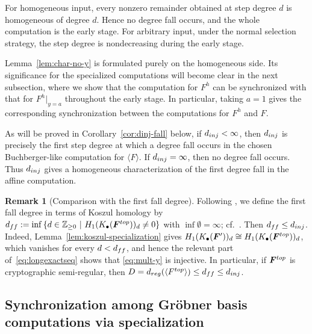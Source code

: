 \documentclass{article}
\theoremstyle{definition}
\newtheorem{remark}[theorem]{Remark}
\theoremstyle{plain}
\theoremstyle{plain}
\theoremstyle{plain}
\theoremstyle{plain}
\numberwithin{equation}{subsection}
\begin{document}
For homogeneous input, every nonzero remainder obtained at step degree $d$ is homogeneous of degree $d$.
Hence no degree fall occurs, and the whole computation is the early stage.
For arbitrary input, under the normal selection strategy, the step degree is nondecreasing during the early stage.

Lemma~\ref{lem:char-no-y} is formulated purely on the homogeneous side.
Its significance for the specialized computations will become clear in the next subsection, where we show that the computation for $F^h$ can be synchronized with that for $F^h|_{y=a}$ throughout the early stage.
In particular, taking $a=1$ gives the corresponding synchronization between the computations for $F^h$ and $F$.

As will be proved in Corollary~\ref{cor:dinj-fall} below, if $d_{\rm inj}<\infty$, then $d_{\rm inj}$ is precisely the first step degree at which a degree fall occurs in the chosen Buchberger-like computation for $\langle F\rangle$.
If $d_{\rm inj}=\infty$, then no degree fall occurs.
Thus $d_{\rm inj}$ gives a homogeneous characterization of the first degree fall in the affine computation.

\begin{remark}[Comparison with the first fall degree]\label{rem:first-fall}
Following \cite[Remark~1]{KY}, we define the first fall degree in terms of Koszul homology by $d_{\rm ff}
:=
\inf\left\{
d\in\mathbb Z_{\geq0}
\ \middle|\
H_1(K_\bullet(\bm F^{\rm top}))_d\neq0
\right\}$ with $\inf\emptyset=\infty$; cf.~\cite[Definition~1.3]{CG23}.
Then $d_{\rm ff}\leq d_{\rm inj}$.
Indeed, Lemma~\ref{lem:koszul-specialization} gives $H_1(K_\bullet(\bm F'))_d \cong H_1(K_\bullet(\bm F^{\rm top}))_d$, which vanishes for every $d<d_{\rm ff}$, and hence the relevant part of~\eqref{eq:longexactseq} shows that \eqref{eq:mult-y} is injective.
In particular, if $\bm F^{\rm top}$ is cryptographic semi-regular, then $D=d_{\rm reg}(\langle F^{\rm top}\rangle)\leq d_{\rm ff}\leq d_{\rm inj}$.
\end{remark}


\subsection{Synchronization among Gr\"obner basis computations via specialization}\label{subsec:sync-aff}
\end{document}
